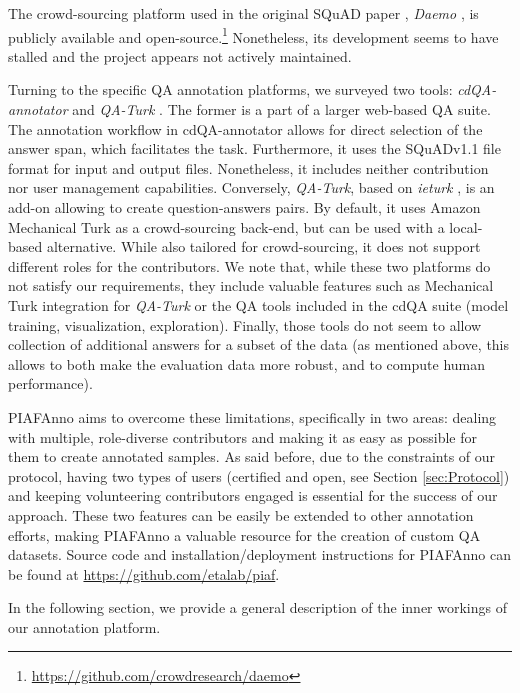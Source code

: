 \documentclass[10pt, a4paper]{article}
\begin{document}
The crowd-sourcing platform used in the original SQuAD paper \cite{rajpurkar2016squad}, \textit{Daemo} \cite{gaikwad2015daemo}, is publicly available and open-source.\footnote{\url{https://github.com/crowdresearch/daemo}} Nonetheless, its development seems to have stalled and the project appears not actively maintained. 

Turning to the specific QA annotation platforms, we surveyed two tools: \textit{cdQA-annotator} \cite{mikaelian2019cdqa} and \textit{QA-Turk} \cite{fisch2018qaturk}. The former is a part of a larger web-based QA suite. The annotation workflow in cdQA-annotator allows for direct selection of the answer span, which facilitates the task. Furthermore, it uses the SQuADv1.1 file format for input and output files. Nonetheless, it includes neither contribution nor user management capabilities. Conversely, \textit{QA-Turk}, based on \textit{ieturk} \cite{quach2018ieturk}, is an add-on allowing to create question-answers pairs. By default, it uses  Amazon Mechanical Turk as a crowd-sourcing back-end, but can be used with a local-based alternative. While also tailored for crowd-sourcing, it does not support different roles for the contributors. We note that, while these two platforms do not satisfy our requirements, they include valuable features such as Mechanical Turk integration for \textit{QA-Turk} or the QA tools included in the cdQA suite (model training, visualization, exploration). Finally, those tools do not seem to allow collection of additional answers for a subset of the data (as mentioned above, this allows to both make the evaluation data more robust, and to compute human performance).

PIAFAnno aims to overcome these limitations, specifically in two  areas: dealing with multiple, role-diverse contributors and  making it as easy as possible for them to create annotated samples. As said before, due to the constraints of our protocol, having two types of users (certified and open, see  Section \ref{sec:Protocol}) and keeping volunteering contributors engaged is essential for the success of our approach. These two features can be easily be extended to other annotation efforts, making PIAFAnno a valuable resource for the creation of custom QA datasets. Source code and installation/deployment instructions for PIAFAnno can be found at \url{https://github.com/etalab/piaf}. 

In the following section, we provide a general description of the inner workings of our annotation platform.
\end{document}
